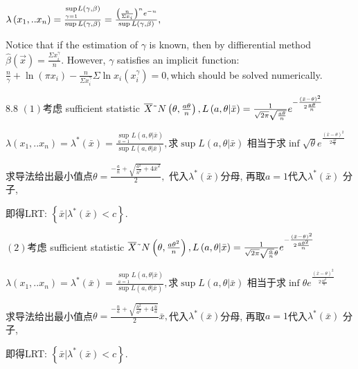 \documentclass{ctexart}
\begin{document}
$\lambda \left( x_{1},..x_{n}\right) =\frac{\underset{\gamma =1}{\sup }%
L\left( \gamma ,\beta \right) }{\sup L\left( \gamma ,\beta \right) }=\frac{%
\left( \frac{n}{\Sigma x_{i}}\right) ^{n}e^{-n}}{\sup L\left( \gamma ,\beta
\right) },$

Notice that if the estimation of $\gamma $ is known, then by diffierential
method $\hat{\beta}\left( \vec{x}\right) =\frac{\Sigma x_{i}^{\gamma }}{n}.$%
However, $\gamma $ satisfies an implicit function: $\frac{n}{\gamma }+\ln
\left( \pi x_{i}\right) -\frac{n}{\Sigma x_{i}^{\gamma }}\Sigma \ln
x_{i}\left( x_{i}^{\gamma }\right) =0,$which should be solved numerically.

8.8 $\left( 1\right) $考虑 sufficient statistic $\overline{X}%
\symbol{126}N\left( \theta ,\frac{a\theta }{n}\right) ,L\left( a,\theta |%
\bar{x}\right) =\frac{1}{\sqrt{2\pi }\sqrt{\frac{a\theta }{n}}}e^{-\frac{%
\left( \bar{x}-\theta \right) ^{2}}{2\frac{a\theta }{n}}}$

$\lambda \left( x_{1},..x_{n}\right) =\lambda ^{\ast }\left( \bar{x}\right) =%
\frac{\underset{a=1}{\sup }L\left( a,\theta |\bar{x}\right) }{\sup L\left(
a,\theta |\bar{x}\right) },$求$\sup L\left( a,\theta |\bar{x}\right) $%
相当于求$\inf \sqrt{\theta }e^{\frac{\left( \bar{x}%
-\theta \right) ^{2}}{2\frac{a\theta }{n}}}$

求导法给出最小值点$%
\theta =\frac{-\frac{a}{n}+\sqrt{\frac{a^{2}}{n^{2}}+4\bar{x}^{2}}}{2},$%
代入$\lambda ^{\ast }\left( \bar{x}\right) $分母,%
再取$a=1$代入$\lambda ^{\ast }\left( \bar{x}\right) $%
分子,

即得LRT: $\left\{ \bar{x}|\lambda ^{\ast }\left( \bar{x}\right)
<c\right\} .$

$\left( 2\right) $考虑 sufficient statistic $\overline{X}\symbol{%
126}N\left( \theta ,\frac{a\theta ^{2}}{n}\right) ,L\left( a,\theta |\bar{x}%
\right) =\frac{1}{\sqrt{2\pi }\sqrt{\frac{a}{n}}\theta }e^{-\frac{\left( 
\bar{x}-\theta \right) ^{2}}{2\frac{a\theta ^{2}}{n}}}$

$\lambda \left( x_{1},..x_{n}\right) =\lambda ^{\ast }\left( \bar{x}\right) =%
\frac{\underset{a=1}{\sup }L\left( a,\theta |\bar{x}\right) }{\sup L\left(
a,\theta |\bar{x}\right) },$求$\sup L\left( a,\theta |\bar{x}\right) $%
相当于求$\inf \theta e^{\frac{\left( \bar{x}-\theta
\right) ^{2}}{2\frac{a\theta ^{2}}{n}}}$

求导法给出最小值点$%
\theta =\frac{-\frac{n}{a}+\sqrt{\frac{n^{2}}{a^{2}}+4\frac{n}{a}}}{2}\bar{x}%
,$代入$\lambda ^{\ast }\left( \bar{x}\right) $分母,%
再取$a=1$代入$\lambda ^{\ast }\left( \bar{x}\right) $%
分子,

即得LRT: $\left\{ \bar{x}|\lambda ^{\ast }\left( \bar{x}\right)
<c\right\} .$
\end{document}
